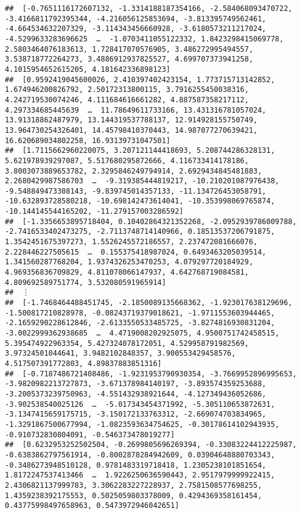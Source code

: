 \documentclass[
]{article}
\begin{document}
\begin{verbatim}
##  [-0.7651116172607132, -1.3314188187354166, -2.584068093470722, -3.4166811792395344, -4.216056125853694, -3.813395749562461, -4.664534632207329, -3.114343456660928, -3.6180573211217024, -4.5299633283696625  …  -1.0703411055122332, 1.8423298415069778, 2.5803464076183613, 1.728417070576905, 3.486272995494557, 3.538718772264273, 3.4886912937825527, 4.699707373941258, 4.1015954652615205, 4.181642336898123]
##  [0.9592419045600026, 2.410397402423154, 1.773715713142852, 1.674946200826792, 2.50172313800115, 3.7916255450038316, 4.242719530074246, 4.111684616661282, 4.887587358217112, 4.297334685445639  …  11.78649611733166, 13.431316781057024, 13.91318862487979, 13.144319537788137, 12.914928155750749, 13.964730254326401, 14.45798410370443, 14.987077270639421, 16.620689034802258, 16.93139731047501]
##  [1.7115662960220075, 3.207121144418693, 5.208744286328131, 5.621978939297087, 5.517680295872666, 4.116733414178186, 3.8003073889653782, 2.3295846249794914, 2.6929434845481883, 2.2680429987586703  …  -9.319385444819217, -10.210201087976438, -9.548849473308143, -9.839745014357133, -11.134726453058791, -10.632893728580218, -10.698142473614041, -10.353998069765874, -10.144145544165202, -11.279157003286592]
##  [-1.3356653895718404, 0.10402864321352268, -2.0952939786009788, -2.7416533402473275, -2.7113748714140966, 0.18513537206791875, 1.3542451675397273, 1.5526245572186557, 2.237472081666076, 2.228446227505615  …  0.155375418987024, 0.6493463205039514, 1.341560287768204, 1.9374326253470253, 4.079297720184929, 4.969356836709829, 4.811078066147937, 4.642768719084581, 4.809692589751774, 3.532080591965914]
##  ⋮
##  [-1.7468464488451745, -2.1850089135668362, -1.923017638129696, -1.500817210828978, -0.08243719379018621, -1.9711553603944465, -2.1659290228612846, -2.6133550533485725, -3.8274816930831204, -3.0022999362938685  …  4.4719008202925075, 4.9500751742458515, 5.395474922963354, 5.427324078172051, 4.529958791982569, 3.97324501044641, 3.9482102848357, 3.900553429458576, 4.517507391772803, 4.89837883851316]
##  [-0.7187486721408486, -1.9231953790930354, -3.7669952896995653, -3.9820982213727873, -3.671378984140197, -3.893574359253688, -3.2005373239750963, -4.551432938921644, -4.127349436052686, -3.902538540025126  …  -5.017343454371992, -5.305110653872631, -3.1347415659175715, -3.150172133763312, -2.669074703834965, -1.3291867500677994, -1.0823593634754625, -0.30178614102943935, -0.910732830804091, -0.546373478019277]
##  [0.6232953252502504, -0.2699805696269394, -0.33083224412225987, -0.6383862797561914, -0.8002878284942609, 0.03904648880703343, -0.3486273948510128, 0.9781483319718418, 1.2305238101851654, 1.8172247537413466  …  1.9226250636590443, 2.9517979999922415, 2.4306821137999783, 3.3062283227228937, 2.7581508577698255, 1.4359238392175553, 0.5025059803378009, 0.4294369358161454, 0.43775998497658963, 0.5473972946042651]

\end{verbatim}
\end{document}
